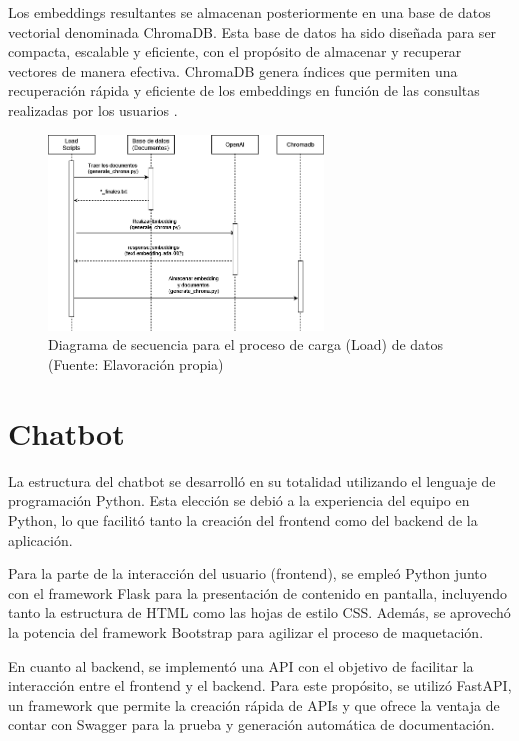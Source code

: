 \par Los embeddings resultantes se almacenan posteriormente en una base de datos vectorial denominada ChromaDB. Esta base de 
datos ha sido diseñada para ser compacta, escalable y eficiente, con el propósito de almacenar y recuperar vectores de manera 
efectiva. ChromaDB genera índices que permiten una recuperación rápida y eficiente de los embeddings en función de las 
consultas realizadas por los usuarios \cite{langchain1}.


\begin{figure}[ht!]
    \centering
    \includegraphics[width=0.65\textwidth]{figures/load_diagram.png}
    \caption[Diagrama de secuencia para el proceso de carga (Load) de datos]{Diagrama de secuencia para el proceso de carga (Load)  de datos\\
    {\scriptsize (Fuente: Elavoración propia)}}
    \label{fig:chatbot1}
\end{figure}

\newpage
\section{Chatbot}

   
La estructura del chatbot se desarrolló en su totalidad utilizando el lenguaje de programación Python. Esta elección se debió a la 
experiencia del equipo en Python, lo que facilitó tanto la creación del frontend como del backend de la aplicación.

Para la parte de la interacción del usuario (frontend), se empleó Python junto con el framework Flask para la presentación 
de contenido en pantalla, incluyendo tanto la estructura de HTML como las hojas de estilo CSS. Además, se aprovechó la potencia del 
framework Bootstrap para agilizar el proceso de maquetación.

En cuanto al backend, se implementó una API con el objetivo de facilitar la interacción entre el frontend y el backend. Para este 
propósito, se utilizó FastAPI, un framework que permite la creación rápida de APIs y que ofrece la ventaja de contar con Swagger 
para la prueba y generación automática de documentación.

